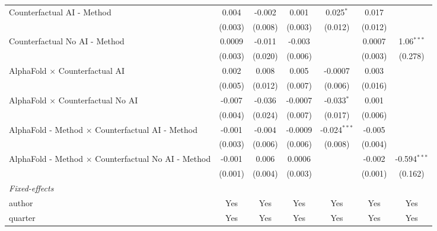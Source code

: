 \begin{tabular}{lcccccc}
   Counterfactual AI - Method                                 & 0.004        & -0.002       & 0.001   & 0.025$^{*}$    & 0.017   &   \\   
                                                              & (0.003)      & (0.008)      & (0.003) & (0.012)        & (0.012) &   \\   
   Counterfactual No AI - Method                              & 0.0009       & -0.011       & -0.003  &                & 0.0007  & 1.06$^{***}$\\   
                                                              & (0.003)      & (0.020)      & (0.006) &                & (0.003) & (0.278)\\   
   AlphaFold $\times$ Counterfactual AI                       & 0.002        & 0.008        & 0.005   & -0.0007        & 0.003   &   \\   
                                                              & (0.005)      & (0.012)      & (0.007) & (0.006)        & (0.016) &   \\   
   AlphaFold $\times$ Counterfactual No AI                    & -0.007       & -0.036       & -0.0007 & -0.033$^{*}$   & 0.001   &   \\   
                                                              & (0.004)      & (0.024)      & (0.007) & (0.017)        & (0.006) &   \\   
   AlphaFold - Method $\times$ Counterfactual AI - Method     & -0.001       & -0.004       & -0.0009 & -0.024$^{***}$ & -0.005  &   \\   
                                                              & (0.003)      & (0.006)      & (0.006) & (0.008)        & (0.004) &   \\   
   AlphaFold - Method $\times$ Counterfactual No AI - Method  & -0.001       & 0.006        & 0.0006  &                & -0.002  & -0.594$^{***}$\\   
                                                              & (0.001)      & (0.004)      & (0.003) &                & (0.001) & (0.162)\\   
   \midrule
   \emph{Fixed-effects}\\
   author                                                     & Yes          & Yes          & Yes     & Yes            & Yes     & Yes\\  
   quarter                                                    & Yes          & Yes          & Yes     & Yes            & Yes     & Yes\\  

\end{tabular}
